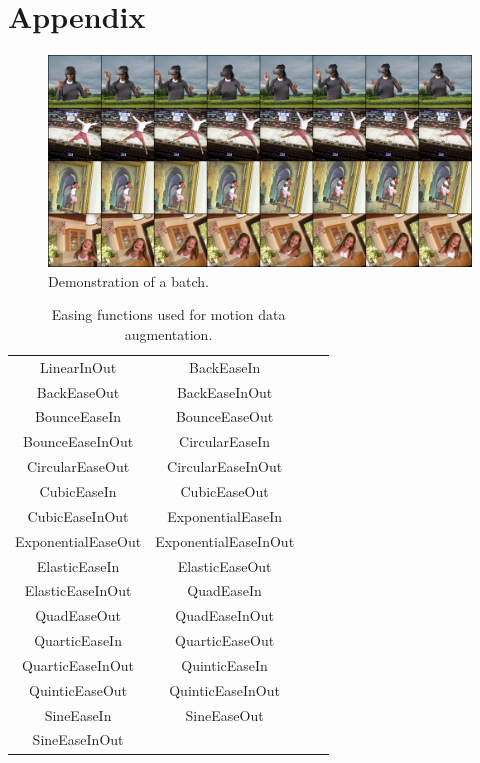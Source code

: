 \documentclass[final]{cvpr}
\begin{document}
\appendix

\section{Appendix}

\begin{figure}[htb]
    \begin{center}
        \includegraphics[width=1\linewidth]{img/batch.png}
    \end{center}
    \caption{Demonstration of a batch.}
    \label{batch}
\end{figure}

\begin{table}[htb]
    \centering
    \caption{Easing functions used for motion data augmentation.}
    \label{easingFunctions}
    \begin{tabular}{cccc}
        \toprule
        LinearInOut      & BackEaseIn        \\ BackEaseOut        & BackEaseInOut        \\
        BounceEaseIn     & BounceEaseOut     \\ BounceEaseInOut    & CircularEaseIn       \\
        CircularEaseOut  & CircularEaseInOut \\ CubicEaseIn        & CubicEaseOut         \\
        CubicEaseInOut   & ExponentialEaseIn \\ ExponentialEaseOut & ExponentialEaseInOut \\
        ElasticEaseIn    & ElasticEaseOut    \\ ElasticEaseInOut   & QuadEaseIn           \\
        QuadEaseOut      & QuadEaseInOut     \\ QuarticEaseIn      & QuarticEaseOut       \\
        QuarticEaseInOut & QuinticEaseIn     \\ QuinticEaseOut     & QuinticEaseInOut     \\
        SineEaseIn       & SineEaseOut       \\ SineEaseInOut \\
        \bottomrule
    \end{tabular}
\end{table}
\end{document}
